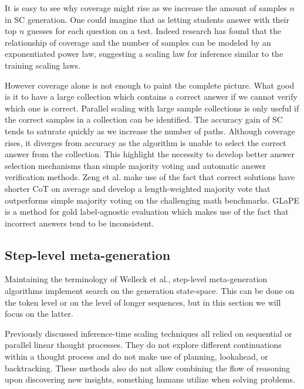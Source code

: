 It is easy to see why coverage might rise as we increase the amount of samples $n$ in SC generation.
One could imagine that as letting students answer with their top $n$ guesses for each question on a test. 
Indeed research\cite{brown2024largelanguagemonkeysscaling} has found that the relationship of coverage and the 
number of samples can be modeled by an exponentiated power law, suggesting a scaling law for inference
similar to the training scaling laws\cite{kaplan2020scalinglawsneurallanguage}.

However coverage alone is not enough to paint the complete picture. What good is it to have a large collection which contains a correct answer
if we cannot verify which one is correct. Parallel scaling with large sample collections is only useful 
if the correct samples in a collection can be identified\cite{brown2024largelanguagemonkeysscaling}\cite{zeng2025revisitingtesttimescalingo1like}.
The accuracy gain of SC tends to saturate quickly as we increase the number of paths\cite{wang2023selfconsistencyimproveschainthought}.
Although coverage rises, it diverges\cite{brown2024largelanguagemonkeysscaling} from accuracy as the algorithm is unable to select the correct answer from the collection.
This highlight the necessity to develop better answer selection mechanisms than simple majority voting and automatic answer verification methods.
\newpage
Zeng et al.\cite{zeng2025revisitingtesttimescalingo1like} make use of the fact that
correct solutions have shorter CoT on average and develop a length-weighted majority vote that outperforms simple majority voting on 
the challenging math benchmarks. GLaPE\cite{zhang2024glapegoldlabelagnosticprompt} is a method for gold label-agnostic evaluation which makes use
of the fact that incorrect answers tend to be inconsistent. 

\subsection{Step-level meta-generation}
Maintaining the terminology of Welleck et al.\cite{welleck2024decodingmetagenerationinferencetimealgorithms}, step-level meta-generation
algorithms implement search on the generation state-space. This can be done on the token level or on the level of longer sequences,
but in this section we will focus on the latter.

Previously discussed inference-time scaling techniques all relied on sequential or parallel linear thought processes. 
They do not explore different continuations within a thought process and do not make use of 
planning, lookahead, or backtracking\cite{yao2023treethoughtsdeliberateproblem}. These methods also do not allow 
combining the flow of reasoning upon discovering new insights, something humans utilize when solving problems\cite{Besta_2024}.

